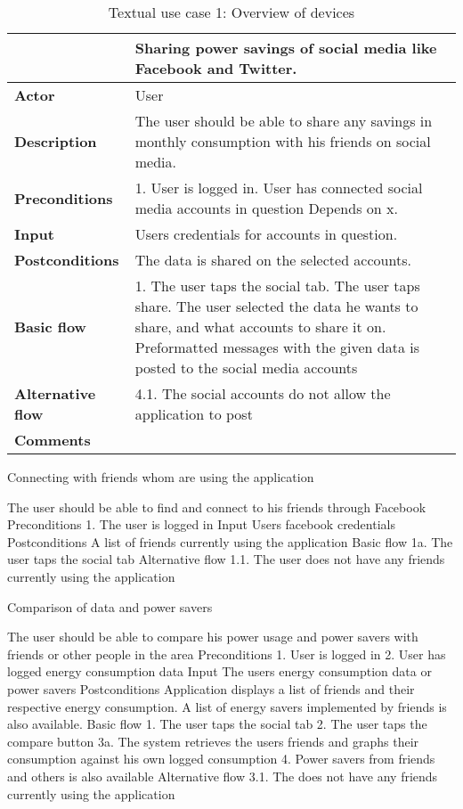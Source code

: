 \begin{table}[H]
\begin{tabular}{|l|p{12cm}|}
\hline
&\textbf{Sharing power savings of social media like Facebook and Twitter.}
\\\hline
\textbf{Actor} &User
\\\hline
\textbf{Description}&
The user should be able to share any savings in monthly consumption with his friends on social media.\\\hline
\textbf{Preconditions}&
1. User is logged in\newline
2. User has connected social media accounts in question\newline
Depends on x.\\\hline
\textbf{Input}&
Users credentials for accounts in question.\\\hline
\textbf{Postconditions}& 
The data is shared on the selected accounts. \\\hline
\textbf{Basic flow}&
1. The user taps the social tab\newline
2. The user taps share\newline
3. The user selected the data he wants to share, and what accounts to share it on\newline
4. Preformatted messages with the given data is posted to the social media accounts
\\\hline
\textbf{Alternative flow}&
4.1. The social accounts do not allow the application to post
\\\hline
\textbf{Comments}& \\\hline
\end{tabular}
\caption{Textual use case 1: Overview of devices}
\end{table}


Connecting with friends whom are using the application

The user should be able to find and connect to his friends through Facebook
Preconditions
1. The user is logged in
Input
Users facebook credentials
Postconditions
A list of friends currently using the application
Basic flow
1a. The user taps the social tab
Alternative flow
1.1. The user does not have any friends currently using the application



Comparison of data and power savers

The user should be able to compare his power usage and power savers with friends or other people in the area
Preconditions
1. User is logged in
2. User has logged energy consumption data
Input
The users energy consumption data or power savers
Postconditions
Application displays a list of friends and their respective energy consumption. A list of energy savers implemented by friends is also available. 
Basic flow
1. The user taps the social tab
2. The user taps the compare button
3a. The system retrieves the users friends and graphs their consumption against his own logged consumption
4. Power savers from friends and others is also available
Alternative flow
3.1. The does not have any friends currently using the application


